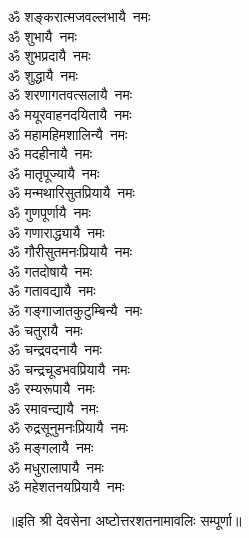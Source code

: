 \begin{flushleft}
\begin{multicols}{2}
ॐ शङ्करात्मजवल्लभायै~नमः\\
ॐ शुभायै~नमः\\
ॐ शुभप्रदायै~नमः\\
ॐ शुद्धायै~नमः\\
ॐ शरणागतवत्सलायै~नमः\\
ॐ मयूरवाहनदयितायै~नमः\\
ॐ महामहिमशालिन्यै~नमः\hfill{}\\
ॐ मदहीनायै~नमः\\
ॐ मातृपूज्यायै~नमः\\
ॐ मन्मथारिसुतप्रियायै~नमः\\
ॐ गुणपूर्णायै~नमः\\
ॐ गणाराद्ध्यायै~नमः\\
ॐ गौरीसुतमनःप्रियायै~नमः\\
ॐ गतदोषायै~नमः\\
ॐ गतावद्यायै~नमः\\
ॐ गङ्गाजातकुटुम्बिन्यै~नमः\\
ॐ चतुरायै~नमः\hfill{}\\
ॐ चन्द्रवदनायै~नमः\\
ॐ चन्द्रचूडभवप्रियायै~नमः\\
ॐ रम्यरूपायै~नमः\\
ॐ रमावन्द्यायै~नमः\\
ॐ रुद्रसूनुमनःप्रियायै~नमः\\
ॐ मङ्गलायै~नमः\\
ॐ मधुरालापायै~नमः\\
ॐ महेशतनयप्रियायै~नमः\\
\end{multicols}
\end{flushleft}
\centerline{॥इति श्री देवसेना अष्टोत्तरशतनामावलिः सम्पूर्णा॥}
